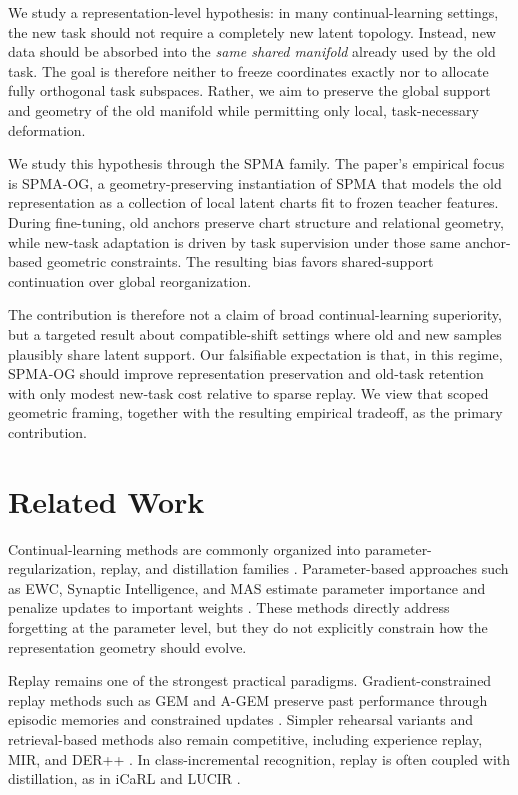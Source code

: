 \documentclass[11pt]{article}
\newcommand{\method}{\textsc{SPMA-OG}}
\newcommand{\spma}{\textsc{SPMA}}
\begin{document}
We study a representation-level hypothesis: in many continual-learning settings, the new task should not require a completely new latent topology. Instead, new data should be absorbed into the \emph{same shared manifold} already used by the old task. The goal is therefore neither to freeze coordinates exactly nor to allocate fully orthogonal task subspaces. Rather, we aim to preserve the global support and geometry of the old manifold while permitting only local, task-necessary deformation.

We study this hypothesis through the \spma{} family. The paper's empirical focus is \method{}, a geometry-preserving instantiation of \spma{} that models the old representation as a collection of local latent charts fit to frozen teacher features. During fine-tuning, old anchors preserve chart structure and relational geometry, while new-task adaptation is driven by task supervision under those same anchor-based geometric constraints. The resulting bias favors shared-support continuation over global reorganization.

The contribution is therefore not a claim of broad continual-learning superiority, but a targeted result about compatible-shift settings where old and new samples plausibly share latent support. Our falsifiable expectation is that, in this regime, \method{} should improve representation preservation and old-task retention with only modest new-task cost relative to sparse replay. We view that scoped geometric framing, together with the resulting empirical tradeoff, as the primary contribution.

\section{Related Work}
Continual-learning methods are commonly organized into parameter-regularization, replay, and distillation families \citep{delange2022survey}. Parameter-based approaches such as EWC, Synaptic Intelligence, and MAS estimate parameter importance and penalize updates to important weights \citep{kirkpatrick2017ewc,zenke2017si,aljundi2018mas}. These methods directly address forgetting at the parameter level, but they do not explicitly constrain how the representation geometry should evolve.

Replay remains one of the strongest practical paradigms. Gradient-constrained replay methods such as GEM and A-GEM preserve past performance through episodic memories and constrained updates \citep{lopez2017gem,chaudhry2019agem}. Simpler rehearsal variants and retrieval-based methods also remain competitive, including experience replay, MIR, and DER++ \citep{rolnick2019experience,aljundi2019mir,buzzega2020dark}. In class-incremental recognition, replay is often coupled with distillation, as in iCaRL and LUCIR \citep{rebuffi2017icarl,hou2019lucir}.
\end{document}
